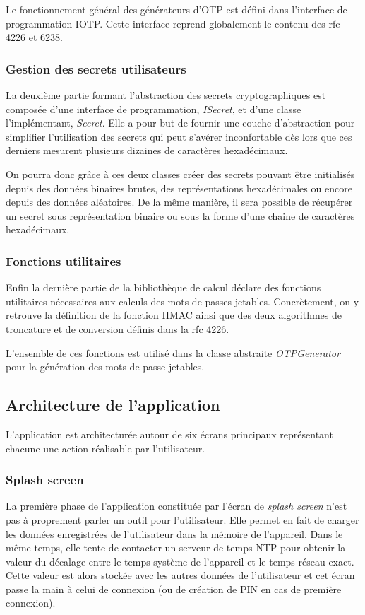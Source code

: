 Le fonctionnement général des générateurs d'OTP est défini dans l'interface de
programmation IOTP. Cette interface reprend globalement le contenu des rfc 4226 et 6238.

\subsubsection{Gestion des secrets utilisateurs}
La deuxième partie formant l'abstraction des secrets cryptographiques est composée d'une
interface de programmation, \emph{ISecret}, et d'une classe l'implémentant, \emph{Secret}.
Elle a pour but de fournir une couche d'abstraction pour simplifier l'utilisation des secrets
qui peut s'avérer inconfortable dès lors que ces derniers mesurent plusieurs dizaines de
caractères hexadécimaux.

On pourra donc grâce à ces deux classes créer des secrets pouvant être initialisés depuis des
données binaires brutes, des représentations hexadécimales ou encore depuis des données
aléatoires. De la même manière, il sera possible de récupérer un secret sous représentation
binaire ou sous la forme d'une chaine de caractères hexadécimaux.

\subsubsection{Fonctions utilitaires}
Enfin la dernière partie de la bibliothèque de calcul déclare des fonctions utilitaires
nécessaires aux calculs des mots de passes jetables. Concrètement, on y retrouve la
définition de la fonction HMAC\cite{HMACrfc} ainsi que des deux algorithmes de troncature et
de conversion définis dans la rfc 4226.

L'ensemble de ces fonctions est utilisé dans la classe abstraite \emph{OTPGenerator} pour la
génération des mots de passe jetables.

\subsection{Architecture de l'application}

L'application est architecturée autour de six écrans principaux représentant chacune une
action réalisable par l'utilisateur.

\subsubsection{Splash screen}
La première phase de l'application constituée par l'écran de \emph{splash screen} n'est pas à
proprement parler un outil pour l'utilisateur. Elle permet en fait de charger les données enregistrées
de l'utilisateur dans la mémoire de l'appareil. Dans le même temps, elle tente de contacter un serveur
de temps NTP pour obtenir la valeur du décalage entre le temps système de l'appareil et le temps réseau
exact. Cette valeur est alors stockée avec les autres données de l'utilisateur et cet écran passe la
main à celui de connexion (ou de création de PIN en cas de première connexion).

